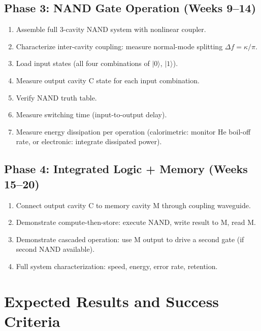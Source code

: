 \documentclass[12pt,a4paper]{article}
\begin{document}
\subsection{Phase 3: NAND Gate Operation (Weeks 9--14)}

\begin{enumerate}
\item Assemble full 3-cavity NAND system with nonlinear coupler.
\item Characterize inter-cavity coupling: measure normal-mode splitting $\Delta f = \kappa/\pi$.
\item Load input states (all four combinations of $|0\rangle$, $|1\rangle$).
\item Measure output cavity C state for each input combination.
\item Verify NAND truth table.
\item Measure switching time (input-to-output delay).
\item Measure energy dissipation per operation (calorimetric: monitor He boil-off rate, or electronic: integrate dissipated power).
\end{enumerate}

\subsection{Phase 4: Integrated Logic + Memory (Weeks 15--20)}

\begin{enumerate}
\item Connect output cavity C to memory cavity M through coupling waveguide.
\item Demonstrate compute-then-store: execute NAND, write result to M, read M.
\item Demonstrate cascaded operation: use M output to drive a second gate (if second NAND available).
\item Full system characterization: speed, energy, error rate, retention.
\end{enumerate}

\section{Expected Results and Success Criteria}
\end{document}
